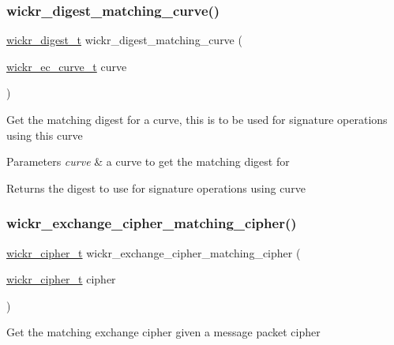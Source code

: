 \subsubsection{\texorpdfstring{wickr\+\_\+digest\+\_\+matching\+\_\+curve()}{wickr\_digest\_matching\_curve()}}
{\footnotesize\ttfamily \hyperlink{structwickr__digest}{wickr\+\_\+digest\+\_\+t} wickr\+\_\+digest\+\_\+matching\+\_\+curve (\begin{DoxyParamCaption}\item[{\hyperlink{structwickr__ec__curve}{wickr\+\_\+ec\+\_\+curve\+\_\+t}}]{curve }\end{DoxyParamCaption})}

Get the matching digest for a curve, this is to be used for signature operations using this curve


\begin{DoxyParams}{Parameters}
{\em curve} & a curve to get the matching digest for \\
\hline
\end{DoxyParams}
\begin{DoxyReturn}{Returns}
the digest to use for signature operations using \textquotesingle{}curve\textquotesingle{} 
\end{DoxyReturn}
\mbox{\label{group__wickr__crypto__engine_gaf44e3be9066727bf83034d3593dc74e2}} 
\subsubsection{\texorpdfstring{wickr\+\_\+exchange\+\_\+cipher\+\_\+matching\+\_\+cipher()}{wickr\_exchange\_cipher\_matching\_cipher()}}
{\footnotesize\ttfamily \hyperlink{structwickr__cipher}{wickr\+\_\+cipher\+\_\+t} wickr\+\_\+exchange\+\_\+cipher\+\_\+matching\+\_\+cipher (\begin{DoxyParamCaption}\item[{\hyperlink{structwickr__cipher}{wickr\+\_\+cipher\+\_\+t}}]{cipher }\end{DoxyParamCaption})}

Get the matching exchange cipher given a message packet cipher

